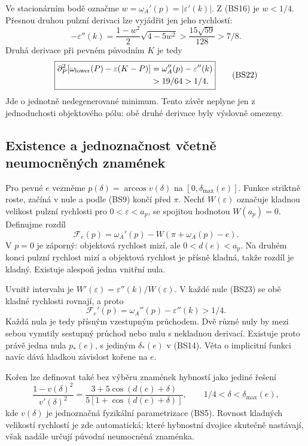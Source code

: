 \documentclass[11pt,a4paper]{article}
\theoremstyle{remark}\newtheorem{remark}[theorem]{Poznámka}
\numberwithin{equation}{section}
\begin{document}
Ve stacionárním bodě označme
\(w=\omega_A'(p)=|\varepsilon'(k)|\). Z (BS16) je \(w<1/4\).
Přesnou druhou pulzní derivaci lze vyjádřit jen jeho rychlostí:
\[
-\varepsilon''(k)
=\frac{1-w^2}{2}\sqrt{4-5w^2}
>\frac{15\sqrt{59}}{128}>7/8.
\tag{BS21}
\]
Druhá derivace při pevném původním \(K\) je tedy
\[
\boxed{\begin{aligned}
\partial_P^2[\omega_{\rm lower}(P)-\varepsilon(K-P)]
&=\omega_A''(p)-\varepsilon''(k)\\
&>19/64>1/4.
\end{aligned}}
\tag{BS22}
\]
Jde o jednotně nedegenerované minimum. Tento závěr neplyne jen
z jednoduchosti objektového pólu: obě druhé derivace byly
výslovně omezeny.

\subsection{Existence a jednoznačnost včetně neumocněných znamének}

Pro pevné \(e\) vezměme \(p(\delta)=\arccos v(\delta)\) na
\([0,\delta_{\max}(e)]\). Funkce striktně roste, začíná v nule
a podle (BS9) končí před \(\pi\). Nechť \(W(\varepsilon)\)
označuje kladnou velikost pulzní rychlosti pro
\(0<\varepsilon<a_p\), se spojitou hodnotou \(W(a_p)=0\).
Definujme rozdíl
\[
\mathcal F_e(p)=\omega_A'(p)
-W(\pi+\omega_A(p)-e).
\tag{BS23}
\]
V \(p=0\) je záporný: objektová rychlost mizí, ale
\(0<d(e)<a_p\). Na druhém konci pulzní rychlost mizí a objektová
rychlost je přísně kladná, takže rozdíl je kladný. Existuje alespoň
jedna vnitřní nula.

Uvnitř intervalu je
\(W'(\varepsilon)=\varepsilon''(k)/W(\varepsilon)\).
V každé nule (BS23) se obě kladné rychlosti rovnají, a proto
\[
\mathcal F_e'(p)=\omega_A''(p)-\varepsilon''(k)>1/4.
\]
Každá nula je tedy přísným vzestupným průchodem. Dvě různé nuly
by mezi sebou vynutily sestupný průchod nebo nulu s nekladnou
derivací. Existuje proto právě jedna nula \(p_*(e)\), s jediným
\(\delta_*(e)\) v (BS14). Věta o implicitní funkci navíc dává
hladkou závislost kořene na \(e\).

Kořen lze definovat také bez výběru znamének hybností jako jediné
řešení
\[
\frac{1-v(\delta)^2}{v'(\delta)^2}
=\frac{3+5\cos(d(e)+\delta)}{5[1+\cos(d(e)+\delta)]},
\qquad 1/4<\delta<\delta_{\max}(e),
\tag{BS24}
\]
kde \(v(\delta)\) je jednoznačná fyzikální parametrizace (BS5).
Rovnost kladných velikostí rychlostí je zde automatická; které
hybnostní dvojice skutečně nastávají, však nadále určují původní
neumocněná znaménka.
\end{document}

